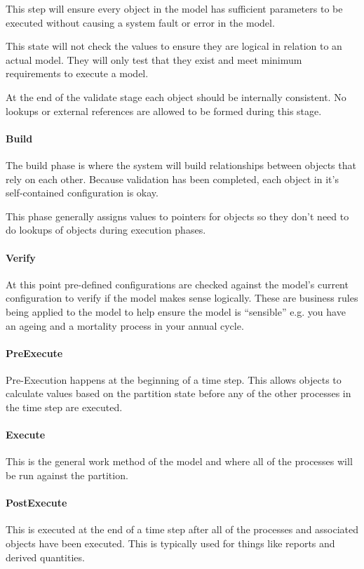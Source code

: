 This step will ensure every object in the model has sufficient parameters to be executed without causing a system fault or error in the model.

This state will not check the values to ensure they are logical in relation to an actual model. They will only test that they exist and meet minimum requirements to execute a model.

At the end of the validate stage each object should be internally consistent. No lookups or external references are allowed to be formed during this stage.

\paragraph*{Build}
The build phase is where the system will build relationships between objects that rely on each other. Because validation has been completed, each object in it's self-contained configuration is okay.

This phase generally assigns values to pointers for objects so they don't need to do lookups of objects during execution phases.

\paragraph*{Verify}
At this point pre-defined configurations are checked against the model's current configuration to verify if the model makes sense logically. These are business rules being applied to the model to help ensure the model is \enquote{sensible} e.g. you have an ageing and a mortality process in your annual cycle.

\paragraph*{PreExecute}
Pre-Execution happens at the beginning of a time step. This allows objects to calculate values based on the partition state before any of the other processes in the time step are executed.

\paragraph*{Execute}
This is the general work method of the model and where all of the processes will be run against the partition.

\paragraph*{PostExecute}
This is executed at the end of a time step after all of the processes and associated objects have been executed. This is typically used for things like reports and derived quantities.

